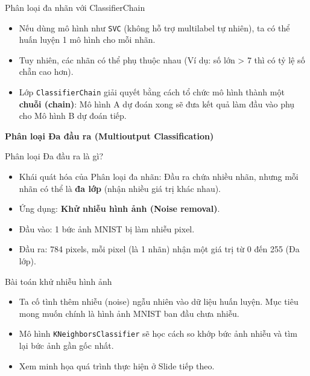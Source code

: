 \documentclass[aspectratio=169]{beamer}
\begin{document}
\begin{frame}{Phân loại đa nhãn với ClassifierChain}
\begin{itemize}
    \item Nếu dùng mô hình như \texttt{SVC} (không hỗ trợ multilabel tự nhiên), ta có thể huấn luyện 1 mô hình cho mỗi nhãn.
    \item Tuy nhiên, các nhãn có thể phụ thuộc nhau (Ví dụ: số lớn > 7 thì có tỷ lệ số chẵn cao hơn).
    \item Lớp \texttt{ClassifierChain} giải quyết bằng cách tổ chức mô hình thành một \textbf{chuỗi (chain)}: Mô hình A dự đoán xong sẽ đưa kết quả làm đầu vào phụ cho Mô hình B dự đoán tiếp.
\end{itemize}
\end{frame}

\begin{frame}
\vfill\centering\LARGE\textbf{Phân loại Đa đầu ra (Multioutput Classification)}\vfill
\end{frame}

\begin{frame}{Phân loại Đa đầu ra là gì?}
\begin{itemize}
    \item Khái quát hóa của Phân loại đa nhãn: Đầu ra chứa nhiều nhãn, nhưng mỗi nhãn có thể là \textbf{đa lớp} (nhận nhiều giá trị khác nhau).
    \item Ứng dụng: \textbf{Khử nhiễu hình ảnh (Noise removal)}.
    \item Đầu vào: 1 bức ảnh MNIST bị làm nhiễu pixel.
    \item Đầu ra: 784 pixels, mỗi pixel (là 1 nhãn) nhận một giá trị từ 0 đến 255 (Đa lớp).
\end{itemize}
\end{frame}

\begin{frame}{Bài toán khử nhiễu hình ảnh}
\begin{itemize}
    \item Ta cố tình thêm nhiễu (noise) ngẫu nhiên vào dữ liệu huấn luyện. Mục tiêu mong muốn chính là hình ảnh MNIST ban đầu chưa nhiễu.
    \item Mô hình \texttt{KNeighborsClassifier} sẽ học cách so khớp bức ảnh nhiễu và tìm lại bức ảnh gần gốc nhất.
    \item Xem minh họa quá trình thực hiện ở Slide tiếp theo.
\end{itemize}
\end{frame}
\end{document}
